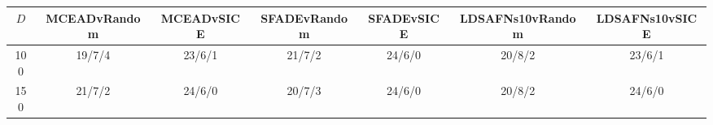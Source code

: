 \begin{tabular}{c c c c c c c}\hline\hline
	$D$	&	MCEADvRandom	&	MCEADvSICE	&	SFADEvRandom	&	SFADEvSICE	&	LDSAFNs10vRandom	&	LDSAFNs10vSICE	\\ \hline
	100	&	19/7/4	&	23/6/1	&	21/7/2	&	24/6/0	&	20/8/2	&	23/6/1	\\
	150	&	21/7/2	&	24/6/0	&	20/7/3	&	24/6/0	&	20/8/2	&	24/6/0	\\ \hline
\end{tabular}
	